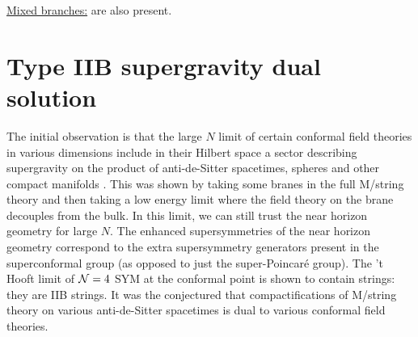        \underline{Mixed branches:} are also present.

\section{Type IIB supergravity dual solution}

    The initial observation is that the large $N$ limit of certain conformal field theories in various dimensions include in their Hilbert space a sector describing supergravity on the product of anti-de-Sitter spacetimes, spheres and other compact manifolds \cite{Maldacena:1997re}. This was shown by taking some branes in the full M/string theory and then taking a low energy limit where the field theory on the brane decouples from the bulk. In this limit, we can still trust the near horizon geometry for large $N$. The enhanced supersymmetries of the near horizon geometry correspond to the extra supersymmetry generators present in the superconformal group (as opposed to just the super-Poincaré group). The 't Hooft limit of $\mathcal{N} = 4$ SYM at the conformal point is shown to contain strings: they are IIB strings. It was the conjectured that compactifications of M/string theory on various anti-de-Sitter spacetimes is dual to various conformal field theories.

